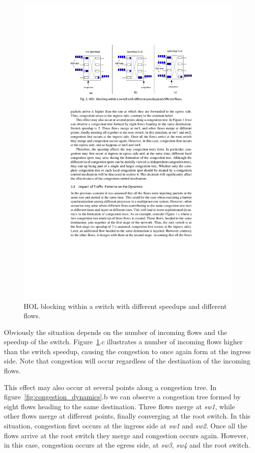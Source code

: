 \documentclass[12pt]{article}
\begin{document}
\begin{figure}[ht]
	\centering
		\includegraphics{speedup_effect.pdf}
		\caption{HOL blocking within a switch with different speedups and different flows.}
		\label{fig:speedup_effect}
\end{figure}

Obviously the situation depends on the number of incoming flows and the speedup of the switch. Figure~\ref{fig:speedup_effect}.c illustrates a number of incoming flows higher than the switch speedup, causing the congestion to once again form at the ingress side. Note that congestion will occur regardless of the destination of the incoming flows. 

This effect may also occur at several points along a congestion tree. In figure~\ref{fig:congestion_dynamics}.b we can observe a congestion tree formed by eight flows heading to the same destination. Three flows merge at \emph{sw1}, while other flows merge at different points, finally converging at the root switch. In this situation, congestion first occurs at the ingress side at \emph{sw1} and \emph{sw2}. Once all the flows arrive at the root switch they merge and congestion occurs again. However, in this case, congestion occurs at the egress side, at \emph{sw3}, \emph{sw4} and the root switch.
\end{document}

